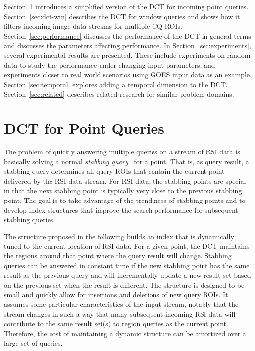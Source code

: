\documentclass{ucdthesis}       %
\begin{document}
Section~\ref{sec:dct-point} introduces a simplified version of the
\ac{DCT} for incoming point queries.  Section~\ref{sec:dct-win}
describes the \acs{DCT} for window queries and shows how it filters
incoming image data streams for multiple \ac{CQ} \acp{ROI}.
Section~\ref{sec:performance} discusses the performance of the
\acs{DCT} in general terms and discusses the parameters affecting
performance.  In Section~\ref{sec:experiments}, several experimental
results are presented.  These include experiments on random data to
study the performance under changing input parameters, and experiments
closer to real world scenarios using \ac{GOES} input data as an
example.  Section \ref{sec:temporal} explores adding a temporal
dimension to the \acs{DCT}.  Section~\ref{sec:related} describes
related research for similar problem domains.

\section{\ac{DCT} for Point Queries}
\label{sec:dct-point}

The problem of quickly answering multiple queries on a stream of RSI
data is basically solving a normal \emph{stabbing
  query}~\cite{berg00comput-geomet} for a point. That is, as query
result, a stabbing query determines all query \acp{ROI} that contain the
current point delivered by the RSI data stream.
For \ac{RSI} data, the stabbing points are special in that the next
stabbing point is typically very close to the previous stabbing point.
The goal is to take advantage of the trendiness of stabbing points and
to develop index structures that improve the search performance for
subsequent stabbing queries.

The structure proposed in the following builds an index that is
dynamically tuned to the current location of RSI data.  For a given
point, the \ac{DCT} maintains the regions around that point where the
query result will change.  Stabbing queries can be answered in
constant time if the new stabbing point has the same result as the
previous query and will incrementally update a new result set based on
the previous set when the result is different.  The structure is
designed to be small and quickly allow for insertions and deletions of
new query \acp{ROI}.  It assumes some particular characteristics of the
input stream, notably that the stream changes in such a way that many
subsequent incoming \acs{RSI} data will contribute to the same result
set(s) to region queries as the current point. Therefore, the cost of
maintaining a dynamic structure can be amortized over a large set of
queries.
\end{document}

